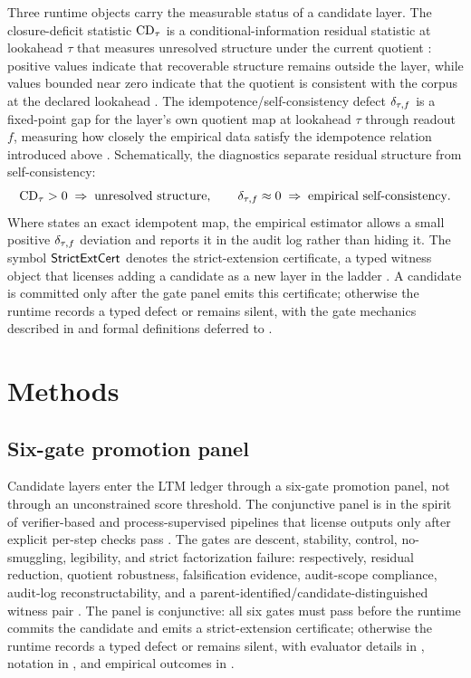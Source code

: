\documentclass{article}
\theoremstyle{definition}
\begin{document}
Three runtime objects carry the measurable status of a candidate layer. The closure-deficit statistic $\mathrm{CD}_{\tau}$ is a conditional-information residual statistic at lookahead $\tau$ that measures unresolved structure under the current quotient \cite{CoverThomas1991Information,Tishby2000Bottleneck}: positive values indicate that recoverable structure remains outside the layer, while values bounded near zero indicate that the quotient is consistent with the corpus at the declared lookahead \cite{Tsiokos2026NoGo}. The idempotence/self-consistency defect $\delta_{\tau,f}$ is a fixed-point gap for the layer's own quotient map at lookahead $\tau$ through readout $f$, measuring how closely the empirical data satisfy the idempotence relation introduced above \cite{Tsiokos2026FoundationsI}. Schematically, the diagnostics separate residual structure from self-consistency:
\[
\mathrm{CD}_{\tau} > 0 \;\Rightarrow\; \text{unresolved structure}, \qquad
\delta_{\tau,f} \approx 0 \;\Rightarrow\; \text{empirical self-consistency}.
\]
Where  states an exact idempotent map, the empirical estimator allows a small positive $\delta_{\tau,f}$ deviation and reports it in the audit log rather than hiding it. The symbol $\mathsf{StrictExtCert}$ denotes the strict-extension certificate, a typed witness object that licenses adding a candidate as a new layer in the ladder \cite{Tsiokos2026CantorShell}. A candidate is committed only after the gate panel emits this certificate; otherwise the runtime records a typed defect or remains silent, with the gate mechanics described in  and formal definitions deferred to .
 \section{Methods}\label{sec:methods}

\subsection{Six-gate promotion panel}\label{subsec:six-gates}

Candidate layers enter the LTM ledger through a six-gate promotion panel, not through an unconstrained score threshold. The conjunctive panel is in the spirit of verifier-based and process-supervised pipelines that license outputs only after explicit per-step checks pass \cite{Cobbe2021Verifiers,Lightman2023StepByStep}. The gates are descent, stability, control, no-smuggling, legibility, and strict factorization failure: respectively, residual reduction, quotient robustness, falsification evidence, audit-scope compliance, audit-log reconstructability, and a parent-identified/candidate-distinguished witness pair \cite{Tsiokos2026FoundationsIII, Tsiokos2026PromotionCriteria}. The panel is conjunctive: all six gates must pass before the runtime commits the candidate and emits a strict-extension certificate; otherwise the runtime records a typed defect or remains silent, with evaluator details in , notation in , and empirical outcomes in .
\end{document}
